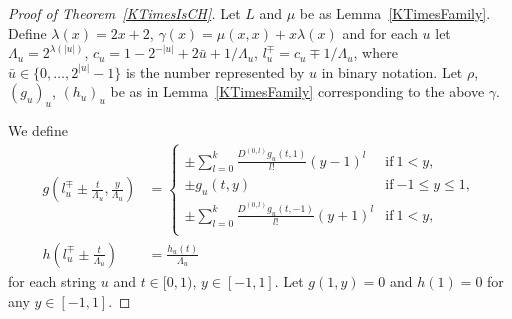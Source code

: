 \documentclass{lmcs}
\theoremstyle{definition}
\theoremstyle{remark}
\newcommand{\D}{D}
\begin{document}
\begin{proof}[Proof of Theorem~\ref{KTimesIsCH}]
Let $L$ and $\mu$ be as Lemma~\ref{KTimesFamily}.
Define
$
  \lambda(x) = 2x + 2
$, $
  \gamma(x) = \mu(x, x) + x \lambda(x)
$
and for each $u$ let
$
 \Lambda_u = 2^{\lambda(|u|)}
$, $
 c_u = 1-{2^{-|u|}}+{2\bar{u}+1}/{\Lambda_u}
$, $
 l_u^\mp = c_u\mp{1}/{\Lambda_u}
$,
 where $\bar u \in \{0, \dots, 2^{|u|} - 1\}$ is the number represented by $u$ in binary notation.
Let $\rho$, $(g_u)_u$, $(h_u)_u$ be as in Lemma~\ref{KTimesFamily} 
corresponding to the above $\gamma$.

We define
 \begin{align} \label{eq:g}
 g \left(l^\mp_u \pm \frac{t}{\Lambda_u}, \frac{y}{\Lambda_u}\right)
  &= \begin{cases}
      \pm \displaystyle \sum_{l=0}^k \frac{\D^{(0,l)}g_u(t,1)}{l!} (y-1)^l 
      &  \text{if} \ 1<y, \\
      \pm g_u(t, y)      & \text{if} \ {-1} \le y \le 1, \\
      \pm \displaystyle \sum_{l=0}^k \frac{\D^{(0,l)}g_u(t,-1)}{l!} (y+1)^l  
      &  \text{if} \ 1<y, \\
    \end{cases} 
  \\
 h \left( l^\mp_u \pm \frac{t}{\Lambda_u} \right) 
  & = \frac{h_u(t)}{\Lambda_u}
\end{align}
for each string $u$ and $t \in [0,1)$, $y \in [-1, 1]$.
Let $g(1,y) = 0$ and $h(1) = 0$ for any $y \in [-1,1]$.


\end{proof}
\end{document}
